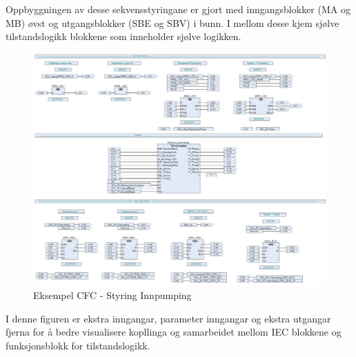 Oppbyggningen av desse sekvensstyringane er gjort med inngangsblokker (MA og MB) øvst og utgangsblokker (SBE og SBV) i bunn.
I mellom desse kjem sjølve tilstandslogikk blokkene som inneholder sjølve logikken.

\begin{figure}[htbp]
    \centering
    \includegraphics[width=1\textwidth]{Bilder/Heile_innpump.png}
    \caption{Eksempel CFC - Styring Innpumping}\label{fig:reaktorsoner}
\end{figure}

I denne figuren er ekstra inngangar, parameter inngangar og ekstra utgangar fjerna for å bedre visualisere kopllinga og samarbeidet mellom
IEC blokkene og funksjonsblokk for tilstandslogikk.

\newpage

